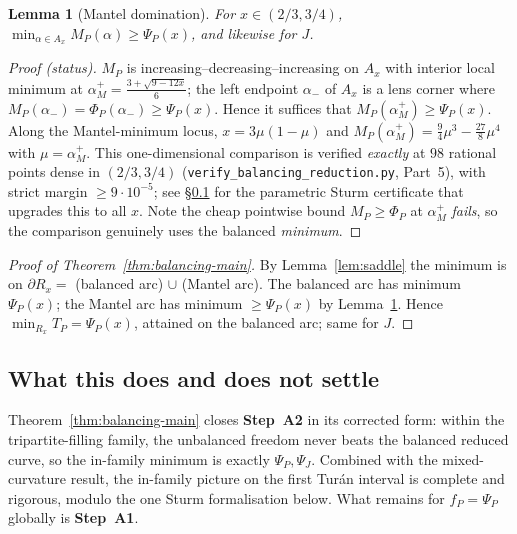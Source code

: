 \documentclass[11pt]{amsart}
\newtheorem{lemma}[theorem]{Lemma}
\theoremstyle{definition}
\newcommand{\1}{\mathbf 1}
\begin{document}
\begin{lemma}[Mantel domination]
\label{lem:mantel}
For $x\in(2/3,3/4)$, $\min_{\alpha\in A_x}M_P(\alpha)\ge\Psi_P(x)$, and likewise
for $J$.
\end{lemma}

\begin{proof}[Proof (status)]
$M_P$ is increasing--decreasing--increasing on $A_x$ with interior local minimum
at $\alpha_M^{+}=\tfrac{3+\sqrt{9-12x}}6$; the left endpoint $\alpha_-$ of $A_x$
is a lens corner where $M_P(\alpha_-)=\Phi_P(\alpha_-)\ge\Psi_P(x)$.  Hence it
suffices that $M_P(\alpha_M^{+})\ge\Psi_P(x)$.  Along the Mantel-minimum locus,
$x=3\mu(1-\mu)$ and $M_P(\alpha_M^{+})=\tfrac94\mu^3-\tfrac{27}8\mu^4$ with
$\mu=\alpha_M^{+}$.  This one-dimensional comparison is verified \emph{exactly}
at $98$ rational points dense in $(2/3,3/4)$
(\texttt{verify\_balancing\_reduction.py}, Part~5), with strict margin
$\ge9\cdot10^{-5}$; see \S\ref{sec:balancing-status} for the parametric Sturm
certificate that upgrades this to all $x$.  Note the cheap pointwise bound
$M_P\ge\Phi_P$ at $\alpha_M^{+}$ \emph{fails}, so the comparison genuinely uses
the balanced \emph{minimum}.
\end{proof}

\begin{proof}[Proof of Theorem~\ref{thm:balancing-main}]
By Lemma~\ref{lem:saddle} the minimum is on $\partial R_x=$ (balanced arc)
$\cup$ (Mantel arc).  The balanced arc has minimum $\Psi_P(x)$; the Mantel arc
has minimum $\ge\Psi_P(x)$ by Lemma~\ref{lem:mantel}.  Hence
$\min_{R_x}T_P=\Psi_P(x)$, attained on the balanced arc; same for $J$.
\end{proof}

\subsection{What this does and does not settle}
\label{sec:balancing-status}

Theorem~\ref{thm:balancing-main} closes \textbf{Step~A2} in its corrected form:
within the tripartite-filling family, the unbalanced freedom never beats the
balanced reduced curve, so the in-family minimum is exactly $\Psi_P,\Psi_J$.
Combined with the mixed-curvature result, the in-family picture on the first
Tur\'an interval is complete and rigorous, modulo the one Sturm formalisation
below.  What remains for $f_P=\Psi_P$ globally is \textbf{Step~A1}.
\end{document}
